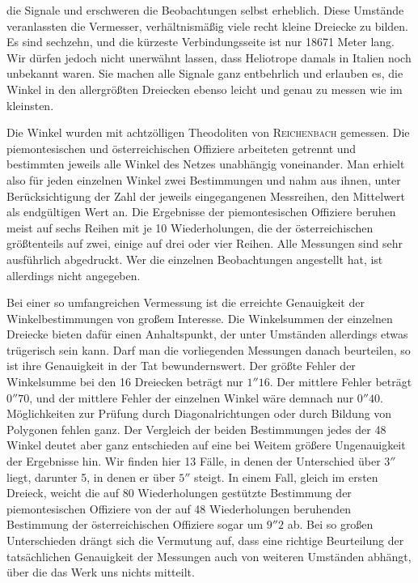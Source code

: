 %
die Signale und erschweren die Beobachtungen selbst erheblich. Diese Umstände veranlassten die Vermesser, verhältnismäßig viele recht kleine Dreiecke zu bilden. Es sind sechzehn, und die kürzeste Verbindungsseite ist nur 18671 Meter lang. Wir dürfen jedoch nicht unerwähnt lassen, dass Heliotrope damals in Italien noch unbekannt waren. Sie machen alle Signale ganz entbehrlich und erlauben es, die Winkel in den allergrößten Dreiecken ebenso leicht und genau zu messen wie im kleinsten.

Die Winkel wurden mit achtzölligen Theodoliten von \textsc{Reichenbach} gemessen. Die piemontesischen und österreichischen Offiziere arbeiteten getrennt und bestimmten jeweils alle Winkel des Netzes unabhängig voneinander. Man erhielt also für jeden einzelnen Winkel zwei Bestimmungen und nahm aus ihnen, unter Berücksichtigung der Zahl der jeweils eingegangenen Messreihen, den Mittelwert als endgültigen Wert an. Die Ergebnisse der piemontesischen Offiziere beruhen meist auf sechs Reihen mit je 10 Wiederholungen, die der österreichischen größtenteils auf zwei, einige auf drei oder vier Reihen. Alle Messungen sind sehr ausführlich abgedruckt. Wer die einzelnen Beobachtungen angestellt hat, ist allerdings nicht angegeben.

Bei einer so umfangreichen Vermessung ist die erreichte Genauigkeit der Winkelbestimmungen von großem Interesse. Die Winkelsummen der einzelnen Dreiecke bieten dafür einen Anhaltspunkt, der unter Umständen allerdings etwas trügerisch sein kann. Darf man die vorliegenden Messungen danach beurteilen, so ist ihre Genauigkeit in der Tat bewundernswert. Der größte Fehler der Winkelsumme bei den 16 Dreiecken beträgt nur \(1''16\). Der mittlere Fehler beträgt \(0''70\), und der mittlere Fehler der einzelnen Winkel wäre demnach nur \(0''40\). Möglichkeiten zur Prüfung durch Diagonalrichtungen oder durch Bildung von Polygonen fehlen ganz. Der Vergleich der beiden Bestimmungen jedes der 48 Winkel deutet aber ganz entschieden auf eine bei Weitem größere Ungenauigkeit der Ergebnisse hin. Wir finden hier 13 Fälle, in denen der Unterschied über \(3''\) liegt, darunter 5, in denen er über \(5''\) steigt. In einem Fall, gleich im ersten Dreieck, weicht die auf 80 Wiederholungen gestützte Bestimmung der piemontesischen Offiziere von der auf 48 Wiederholungen beruhenden Bestimmung der österreichischen Offiziere sogar um \(9''2\) ab. Bei so großen Unterschieden drängt sich die Vermutung auf, dass eine richtige Beurteilung der tatsächlichen Genauigkeit der Messungen auch von weiteren Umständen abhängt, über die das Werk uns nichts mitteilt.

